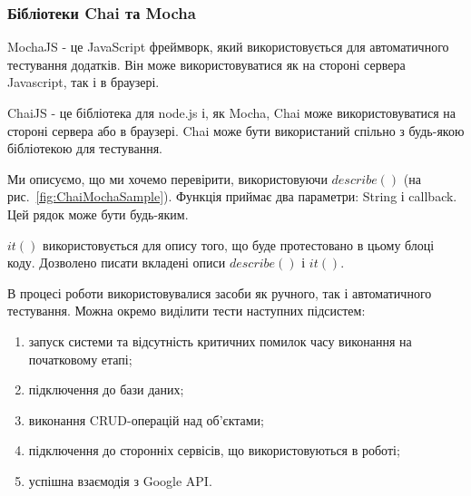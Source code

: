 \subsubsection{Бібліотеки Chai та Mocha}


MochaJS - це JavaScript фреймворк, який використовується для автоматичного тестування додатків. Він може використовуватися як на стороні сервера Javascript, так і в браузері. 

ChaiJS - це бібліотека для node.js і, як Mocha, Chai може використовуватися на стороні сервера або в браузері. Chai може бути використаний спільно з будь-якою бібліотекою для тестування.

Ми описуємо, що ми хочемо перевірити, використовуючи $describe()$ (на рис.~\ref{fig:ChaiMochaSample}). Функція приймає два параметри: String і callback. Цей рядок може бути будь-яким.

$it()$ використовується для опису того, що буде протестовано в цьому блоці коду. Дозволено писати вкладені описи $describe()$ і $it()$.

В процесі роботи використовувалися засоби як ручного, так і автоматичного тестування. 
Можна окремо виділити тести наступних підсистем:

\begin{enumerate}
    \item запуск системи та відсутність  критичних помилок часу виконання на початковому етапі;
    \item підключення до бази даних;
    \item виконання CRUD-операцій над об'єктами;
    \item підключення до сторонніх сервісів, що використовуються в роботі;
    \item успішна взаємодія з Google API.
\end{enumerate}

